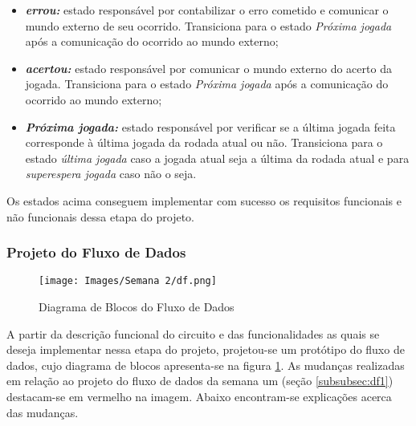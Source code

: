 \documentclass[amsmath,amssymb,floatfix]{report}
\begin{document}
\begin{itemize}
    \item \textbf{\textit{errou:}} estado responsável por contabilizar o erro cometido e comunicar o mundo externo de seu ocorrido. Transiciona para o estado \textit{Próxima jogada} após a comunicação do ocorrido ao mundo externo;
    \item \textbf{\textit{acertou:}} estado responsável por comunicar o mundo externo do acerto da jogada. Transiciona para o estado \textit{Próxima jogada} após a comunicação do ocorrido ao mundo externo;
    \item \textbf{\textit{Próxima jogada:}} estado responsável por verificar se a última jogada feita corresponde à última jogada da rodada atual ou não. Transiciona para o estado \textit{última jogada} caso a jogada atual seja a última da rodada atual e para \textit{superespera jogada} caso não o seja.
\end{itemize}

Os estados acima conseguem implementar com sucesso os requisitos funcionais e não funcionais dessa etapa do projeto.


\subsubsection{Projeto do Fluxo de Dados}
\label{subsubsec:df2}

\begin{figure}[H]
    \centering
    \texttt{[image: Images/Semana 2/df.png]}
    \caption{Diagrama de Blocos do Fluxo de Dados}
    \label{fig:df2}
\end{figure}

A partir da descrição funcional do circuito e das funcionalidades as quais se deseja implementar nessa etapa do projeto, projetou-se um protótipo do fluxo de dados, cujo diagrama de blocos apresenta-se na figura \ref{fig:df2}. As mudanças realizadas em relação ao projeto do fluxo de dados da semana um (seção \ref{subsubsec:df1}) destacam-se em vermelho na imagem. Abaixo encontram-se explicações acerca das mudanças.
\end{document}
